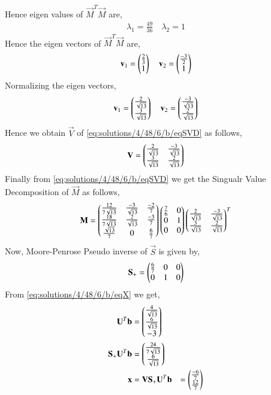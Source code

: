 Hence eigen values of $\vec{M}^T\vec{M}$ are,
\begin{align}
\lambda_1 = \frac{49}{36}\quad
\lambda_2 = 1
\end{align}
Hence the eigen vectors of $\vec{M}^T\vec{M}$ are,
\begin{align}
\mathbf{v}_1=\begin{pmatrix}\frac{2}{3}\\1\end{pmatrix} \quad
\mathbf{v}_2=\begin{pmatrix}\frac{-3}{2}\\1\end{pmatrix}
\end{align}
Normalizing the eigen vectors,
\begin{align}
\mathbf{v}_1=\begin{pmatrix}\frac{2}{\sqrt{13}}\\\frac{3}{\sqrt{13}}\end{pmatrix} \quad
\mathbf{v}_2=\begin{pmatrix}\frac{-3}{\sqrt{13}}\\\frac{2}{\sqrt{13}}\end{pmatrix}
\end{align}
Hence we obtain $\vec{V}$ of \eqref{eq:solutions/4/48/6/b/eqSVD} as follows,
\begin{align}
\mathbf{V}=\begin{pmatrix}\frac{2}{\sqrt{13}}&\frac{-3}{\sqrt{13}}\\\frac{3}{\sqrt{13}}&\frac{2}{\sqrt{13}}\end{pmatrix}
\end{align}
Finally from \eqref{eq:solutions/4/48/6/b/eqSVD} we get the Singualr Value Decomposition of $\vec{M}$ as follows,
\begin{align}
\mathbf{M} = \begin{pmatrix}\frac{12}{7\sqrt{13}}&\frac{-3}{\sqrt{13}}&\frac{-2}{7}\\\frac{18}{7\sqrt{13}}&\frac{2}{\sqrt{13}}&\frac{-3}{7}\\\frac{\sqrt{13}}{7}&0&\frac{6}{7}\end{pmatrix}\begin{pmatrix}\frac{7}{6}&0\\0&1\\0&0\end{pmatrix}\begin{pmatrix}\frac{2}{\sqrt{13}}&\frac{-3}{\sqrt{13}}\\\frac{3}{\sqrt{13}}&\frac{2}{\sqrt{13}}\end{pmatrix}^T
\end{align}
Now, Moore-Penrose Pseudo inverse of $\vec{S}$ is given by,
\begin{align}
\mathbf{S_+} =\begin{pmatrix}\frac{6}{7}&0&0\\0&1&0\end{pmatrix}
\end{align}
From \eqref{eq:solutions/4/48/6/b/eqX} we get,
\begin{align}
\mathbf{U}^T\mathbf{b}&=\begin{pmatrix}\frac{4}{\sqrt{13}}\\\frac{6}{\sqrt{13}}\\-3\end{pmatrix}\\
\mathbf{S_+}\mathbf{U}^T\mathbf{b}&=\begin{pmatrix}\frac{24}{7\sqrt{13}}\\\frac{6}{\sqrt{13}}\end{pmatrix}\\
\mathbf{x} &= \mathbf{V}\mathbf{S_+}\mathbf{U}^T\mathbf{b} &= \begin{pmatrix}\frac{-6}{7}\\\frac{12}{7}\end{pmatrix}\label{eq:solutions/4/48/6/b/eqXSol1}
\end{align}
